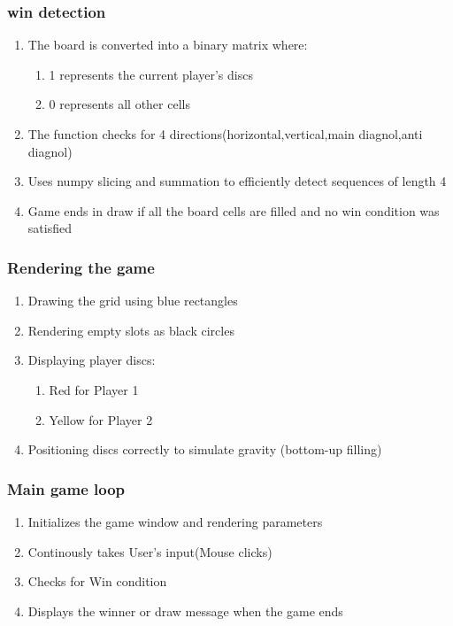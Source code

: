 \documentclass{article}
\begin{document}
\subsubsection{win detection}
\begin{enumerate}
    \item The board is converted into a binary matrix where:
    \begin{enumerate}
        \item 1 represents the current player's discs
        \item 0 represents all other cells
    \end{enumerate}
    \item The function checks for 4 directions(horizontal,vertical,main diagnol,anti diagnol)
    \item Uses numpy slicing and summation to efficiently detect sequences of length 4
    \item Game ends in draw if all the board cells are filled and no win condition was satisfied
\end{enumerate}
\subsubsection{Rendering the game}
\begin{enumerate}
    \item Drawing the grid using blue rectangles
    \item Rendering empty slots as black circles
    \item Displaying player discs:
    \begin{enumerate}
        \item Red for Player 1
        \item Yellow for Player 2
    \end{enumerate}
    \item Positioning discs correctly to simulate gravity (bottom-up filling)
\end{enumerate}
\subsubsection{Main game loop}
\begin{enumerate}
    \item Initializes the game window and rendering parameters
    \item Continously takes User's input(Mouse clicks)
    \item Checks for Win condition
    \item Displays the winner or draw message when the game ends
\end{enumerate}
\end{document}
